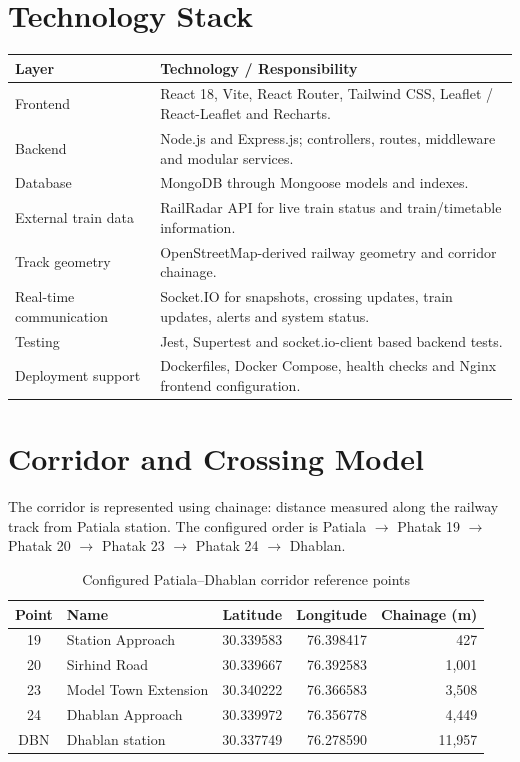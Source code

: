 \documentclass[11pt,a4paper]{report}
\begin{document}
\section{Technology Stack}
\begin{longtable}{p{3.0cm}p{10.5cm}}
\toprule
\textbf{Layer} & \textbf{Technology / Responsibility}\\
\midrule
Frontend & React 18, Vite, React Router, Tailwind CSS, Leaflet / React-Leaflet and Recharts.\\
Backend & Node.js and Express.js; controllers, routes, middleware and modular services.\\
Database & MongoDB through Mongoose models and indexes.\\
External train data & RailRadar API for live train status and train/timetable information.\\
Track geometry & OpenStreetMap-derived railway geometry and corridor chainage.\\
Real-time communication & Socket.IO for snapshots, crossing updates, train updates, alerts and system status.\\
Testing & Jest, Supertest and socket.io-client based backend tests.\\
Deployment support & Dockerfiles, Docker Compose, health checks and Nginx frontend configuration.\\
\bottomrule
\end{longtable}

\section{Corridor and Crossing Model}
The corridor is represented using chainage: distance measured along the railway track from Patiala station. The configured order is Patiala $\rightarrow$ Phatak 19 $\rightarrow$ Phatak 20 $\rightarrow$ Phatak 23 $\rightarrow$ Phatak 24 $\rightarrow$ Dhablan.

\begin{table}[H]\centering
\caption{Configured Patiala--Dhablan corridor reference points}
\label{tab:corridor}
\begin{tabularx}{\textwidth}{c X r r r}
\toprule
\textbf{Point} & \textbf{Name} & \textbf{Latitude} & \textbf{Longitude} & \textbf{Chainage (m)}\\
\midrule
19 & Station Approach & 30.339583 & 76.398417 & 427\\
20 & Sirhind Road & 30.339667 & 76.392583 & 1,001\\
23 & Model Town Extension & 30.340222 & 76.366583 & 3,508\\
24 & Dhablan Approach & 30.339972 & 76.356778 & 4,449\\
DBN & Dhablan station & 30.337749 & 76.278590 & 11,957\\
\bottomrule
\end{tabularx}
\end{table}
\end{document}
